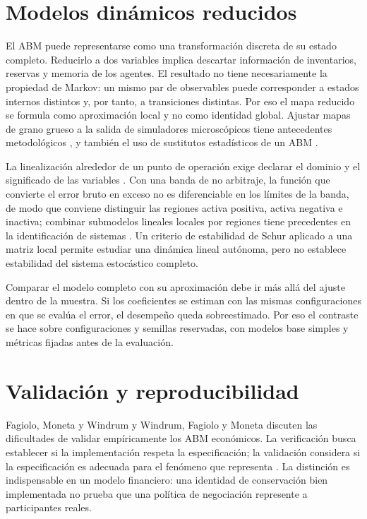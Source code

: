 \section{Modelos dinámicos reducidos}

El ABM puede representarse como una transformación discreta de su estado completo. Reducirlo a dos variables implica descartar información de inventarios, reservas y memoria de los agentes. El resultado no tiene necesariamente la propiedad de Markov: un mismo par de observables puede corresponder a estados internos distintos y, por tanto, a transiciones distintas. Por eso el mapa reducido se formula como aproximación local y no como identidad global. Ajustar mapas de grano grueso a la salida de simuladores microscópicos tiene antecedentes metodológicos \cite{gear2003equationfree}, y también el uso de sustitutos estadísticos de un ABM \cite{lamperti2018surrogates}.

La linealización alrededor de un punto de operación exige declarar el dominio y el significado de las variables \cite{roubal2010linearization}. Con una banda de no arbitraje, la función que convierte el error bruto en exceso no es diferenciable en los límites de la banda, de modo que conviene distinguir las regiones activa positiva, activa negativa e inactiva; combinar submodelos lineales locales por regiones tiene precedentes en la identificación de sistemas \cite{takagi1985fuzzy}. Un criterio de estabilidad de Schur \cite{schur1917potenzreihen,jury1962simplified,elaydi2005difference} aplicado a una matriz local permite estudiar una dinámica lineal autónoma, pero no establece estabilidad del sistema estocástico completo.

Comparar el modelo completo con su aproximación debe ir más allá del ajuste dentro de la muestra. Si los coeficientes se estiman con las mismas configuraciones en que se evalúa el error, el desempeño queda sobreestimado. Por eso el contraste se hace sobre configuraciones y semillas reservadas, con modelos base simples y métricas fijadas antes de la evaluación.

\section{Validación y reproducibilidad}

Fagiolo, Moneta y Windrum \cite{fagiolo2007critical} y Windrum, Fagiolo y Moneta \cite{windrum2007empirical} discuten las dificultades de validar empíricamente los ABM económicos. La verificación busca establecer si la implementación respeta la especificación; la validación considera si la especificación es adecuada para el fenómeno que representa \cite{sargent2013verification}. La distinción es indispensable en un modelo financiero: una identidad de conservación bien implementada no prueba que una política de negociación represente a participantes reales.

